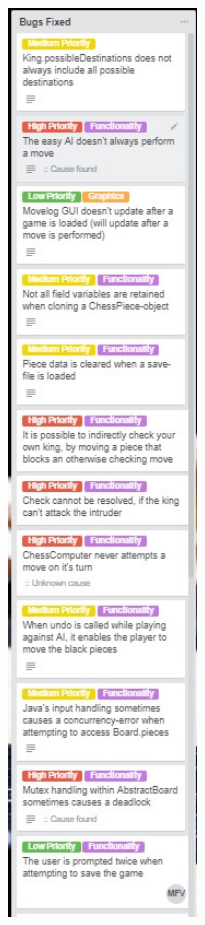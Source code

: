 \documentclass{article}
\begin{document}
\includegraphics[width=5cm]{bugsFixed1.jpg}
\end{document}
